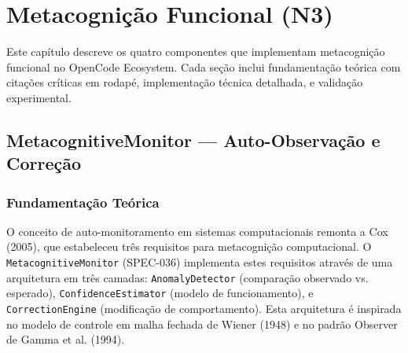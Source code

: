 \chapter{Metacognição Funcional (N3)}
\label{ch:metacognicao}

Este capítulo descreve os quatro componentes que implementam metacognição funcional no OpenCode Ecosystem. Cada seção inclui fundamentação teórica com citações críticas em rodapé, implementação técnica detalhada, e validação experimental.

\section{MetacognitiveMonitor — Auto-Observação e Correção}

\subsection{Fundamentação Teórica}

O conceito de auto-monitoramento em sistemas computacionais remonta a Cox (2005), que estabeleceu três requisitos para metacognição computacional. O \texttt{MetacognitiveMonitor} (SPEC-036) implementa estes requisitos através de uma arquitetura em três camadas: \texttt{AnomalyDetector} (comparação observado vs. esperado), \texttt{ConfidenceEstimator} (modelo de funcionamento), e \texttt{CorrectionEngine} (modificação de comportamento). Esta arquitetura é inspirada no modelo de controle em malha fechada de Wiener (1948) e no padrão Observer de Gamma et al. (1994).

